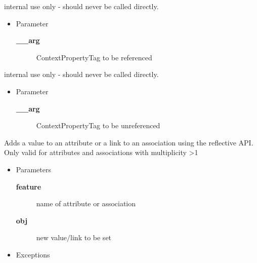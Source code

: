 \begin{desc}internal use only - should never be called directly.
\begin{itemize}
\item{Parameter
  \begin{description}
   \item[{\bf \_\_arg}]{ContextPropertyTag to be referenced}
  \end{description}}
\end{itemize}
\end{desc}

\begin{desc}internal use only - should never be called directly.
\begin{itemize}
\item{Parameter
  \begin{description}
   \item[{\bf \_\_arg}]{ContextPropertyTag to be unreferenced}
  \end{description}}
\end{itemize}
\end{desc}

\begin{desc}Adds a value to an attribute or a link to an association using the
 reflective API. Only valid for attributes and associations with
 multiplicity \textgreater  1
\begin{itemize}
\item{Parameters
  \begin{description}
   \item[{\bf feature}]{name of attribute or association}
   \item[{\bf obj}]{new value$/$link to be set}
  \end{description}}
\end{itemize}
\begin{itemize}
\item{{Exceptions}
}
\end{itemize}
\end{desc}

